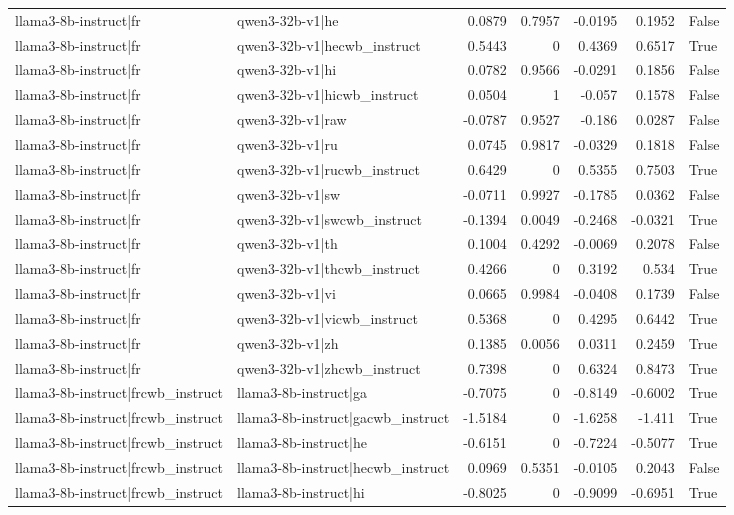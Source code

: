 \begin{table}
\begin{tabular}{l l r r r r l}
llama3-8b-instruct|fr & qwen3-32b-v1|he & 0.0879 & 0.7957 & -0.0195 & 0.1952 & False \\
llama3-8b-instruct|fr & qwen3-32b-v1|hecwb_instruct & 0.5443 & 0 & 0.4369 & 0.6517 & True \\
llama3-8b-instruct|fr & qwen3-32b-v1|hi & 0.0782 & 0.9566 & -0.0291 & 0.1856 & False \\
llama3-8b-instruct|fr & qwen3-32b-v1|hicwb_instruct & 0.0504 & 1 & -0.057 & 0.1578 & False \\
llama3-8b-instruct|fr & qwen3-32b-v1|raw & -0.0787 & 0.9527 & -0.186 & 0.0287 & False \\
llama3-8b-instruct|fr & qwen3-32b-v1|ru & 0.0745 & 0.9817 & -0.0329 & 0.1818 & False \\
llama3-8b-instruct|fr & qwen3-32b-v1|rucwb_instruct & 0.6429 & 0 & 0.5355 & 0.7503 & True \\
llama3-8b-instruct|fr & qwen3-32b-v1|sw & -0.0711 & 0.9927 & -0.1785 & 0.0362 & False \\
llama3-8b-instruct|fr & qwen3-32b-v1|swcwb_instruct & -0.1394 & 0.0049 & -0.2468 & -0.0321 & True \\
llama3-8b-instruct|fr & qwen3-32b-v1|th & 0.1004 & 0.4292 & -0.0069 & 0.2078 & False \\
llama3-8b-instruct|fr & qwen3-32b-v1|thcwb_instruct & 0.4266 & 0 & 0.3192 & 0.534 & True \\
llama3-8b-instruct|fr & qwen3-32b-v1|vi & 0.0665 & 0.9984 & -0.0408 & 0.1739 & False \\
llama3-8b-instruct|fr & qwen3-32b-v1|vicwb_instruct & 0.5368 & 0 & 0.4295 & 0.6442 & True \\
llama3-8b-instruct|fr & qwen3-32b-v1|zh & 0.1385 & 0.0056 & 0.0311 & 0.2459 & True \\
llama3-8b-instruct|fr & qwen3-32b-v1|zhcwb_instruct & 0.7398 & 0 & 0.6324 & 0.8473 & True \\
llama3-8b-instruct|frcwb_instruct & llama3-8b-instruct|ga & -0.7075 & 0 & -0.8149 & -0.6002 & True \\
llama3-8b-instruct|frcwb_instruct & llama3-8b-instruct|gacwb_instruct & -1.5184 & 0 & -1.6258 & -1.411 & True \\
llama3-8b-instruct|frcwb_instruct & llama3-8b-instruct|he & -0.6151 & 0 & -0.7224 & -0.5077 & True \\
llama3-8b-instruct|frcwb_instruct & llama3-8b-instruct|hecwb_instruct & 0.0969 & 0.5351 & -0.0105 & 0.2043 & False \\
llama3-8b-instruct|frcwb_instruct & llama3-8b-instruct|hi & -0.8025 & 0 & -0.9099 & -0.6951 & True \\

\end{tabular}
\end{table}
